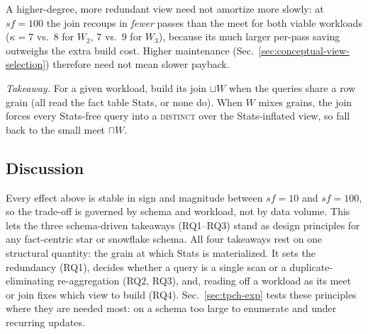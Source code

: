 \documentclass[sigconf]{acmart}
\begin{document}

A higher-degree, more redundant view need not amortize more slowly: at $sf=100$ the join recoups in \emph{fewer} passes than the meet for both viable workloads ($\kappa=7$ vs.\ $8$ for $W_2$, $7$ vs.\ $9$ for $W_3$), because its much larger per-pass saving outweighs the extra build cost. Higher maintenance (Sec.~\ref{sec:conceptual-view-selection}) therefore need not mean slower payback.

\noindent\emph{Takeaway.} For a given workload, build its join $\sqcup W$ when the queries share a row grain (all read the fact table \textsf{Stats}, or none do). When $W$ mixes grains, the join forces every \textsf{Stats}-free query into a \textsc{distinct} over the \textsf{Stats}-inflated view, so fall back to the small meet $\sqcap W$.

\subsection{Discussion}
\label{sec:exp:discussion}

Every effect above is stable in sign and magnitude between $sf=10$ and $sf=100$, so the trade-off is governed by schema and workload, not by data volume. This lets the three schema-driven takeaways (RQ1--RQ3) stand as design principles for any fact-centric star or snowflake schema. %
All four takeaways rest on one structural quantity: the grain at which \textsf{Stats} is materialized. It sets the redundancy (RQ1), decides whether a query is a single scan or a duplicate-eliminating re-aggregation (RQ2, RQ3), and, reading off a workload as its meet or join fixes which view to build (RQ4). Sec.~\ref{sec:tpch-exp} tests these principles where they are needed most: on a schema too large to enumerate and under recurring updates. %
\end{document}
